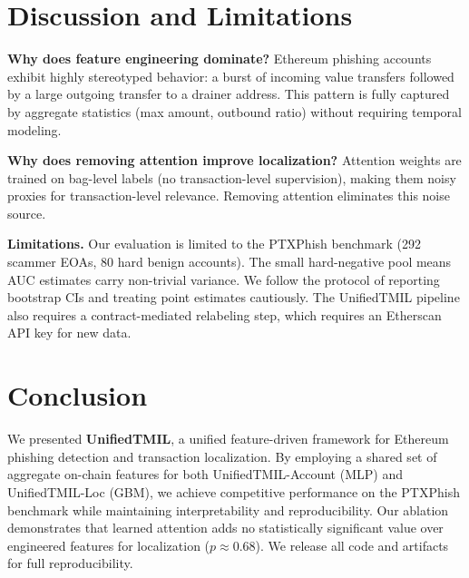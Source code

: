 \documentclass[conference]{IEEEtran}
\newcommand{\ours}{UnifiedTMIL}
\begin{document}
\FloatBarrier

\section{Discussion and Limitations}\label{sec:discussion}

\textbf{Why does feature engineering dominate?} Ethereum phishing accounts exhibit highly stereotyped behavior: a burst of incoming value transfers followed by a large outgoing transfer to a drainer address. This pattern is fully captured by aggregate statistics (max amount, outbound ratio) without requiring temporal modeling.

\textbf{Why does removing attention improve localization?} Attention weights are trained on bag-level labels (no transaction-level supervision), making them noisy proxies for transaction-level relevance. Removing attention eliminates this noise source.

\textbf{Limitations.} Our evaluation is limited to the PTXPhish benchmark (292 scammer EOAs, 80 hard benign accounts). The small hard-negative pool means AUC estimates carry non-trivial variance. We follow the protocol of reporting bootstrap CIs and treating point estimates cautiously. The \ours{} pipeline also requires a contract-mediated relabeling step, which requires an Etherscan API key for new data.

\section{Conclusion}\label{sec:conclusion}

We presented \textbf{\ours{}}, a unified feature-driven framework for Ethereum phishing detection and transaction localization. By employing a shared set of aggregate on-chain features for both \ours{}-Account (MLP) and \ours{}-Loc (GBM), we achieve competitive performance on the PTXPhish benchmark while maintaining interpretability and reproducibility. Our ablation demonstrates that learned attention adds no statistically significant value over engineered features for localization ($p \approx 0.68$). We release all code and artifacts for full reproducibility.



\end{document}
